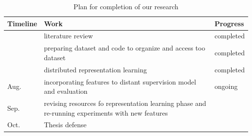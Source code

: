 \documentclass[12pt]{report}
\begin{document}
\begin{table}[hc]
\begin{small}
\begin{center}
\begin{tabular}{lll}
Timeline & Work & Progress\\
\hline
          & literature review & completed\\
          & preparing dataset and code to organize and access too dataset &
          completed\\
          & distributed representation learning & completed\\
Aug. & incorporating features to distant supervision model and evaluation &
ongoing\\
Sep. & revising resources fo representation learning phase and
re-running experiments with new features &
\\
Oct. & Thesis defense & \\
\end{tabular}
\end{center}
\end{small}
\caption{Plan for completion of our research}
\label{tab:plan}
\end{table}

\pagebreak

\begin{footnotesize}

%

\end{footnotesize}
\end{document}
